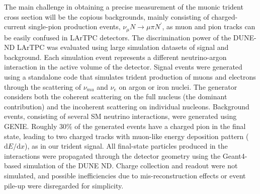 The main challenge in obtaining a precise measurement of the muonic trident cross section will be the copious backgrounds, mainly consisting of charged-current single-pion production events, $\nu_\mu N \to \mu \pi N^\prime$, as muon and pion tracks can be easily confused in LArTPC detectors. The discrimination power of the DUNE-ND LArTPC was evaluated using large simulation datasets of signal and background. Each simulation event represents a different neutrino-argon interaction in the active volume of the detector. Signal events were generated using a standalone code \cite{} that simulates trident production of muons and electrons through the scattering of $\nu_{mu}$ and $\nu_e$ on argon or iron nuclei. The generator considers both the coherent scattering on the full nucleus (the dominant contribution) and the incoherent scattering on individual nucleons. Background events, consisting of several SM neutrino interactions, were generated using GENIE. Roughly $30\%$ of the generated events have a charged pion in the final state, leading to two charged tracks with muon-like energy deposition pattern ($\mathrm{d}E/\mathrm{d}x$), as in our trident signal. All final-state particles produced in the interactions were propagated through the detector geometry using the Geant4-based \cite{Agostinelli:2002hh,Allison:2006ve,Allison:2016lfl} simulation of the DUNE ND. Charge collection and readout were not simulated, and possible inefficiencies due to mis-reconstruction effects or event pile-up were disregarded for simplicity.

